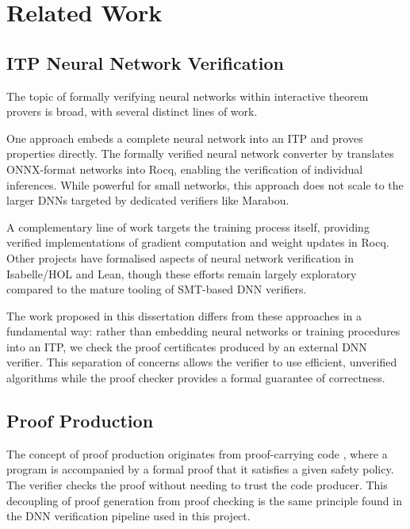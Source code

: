 \section{Related Work} \label{sec:related-work}

\subsection{ITP Neural Network Verification}

The topic of formally verifying neural networks within interactive theorem provers is broad, with several distinct lines of work.

One approach embeds a complete neural network into an ITP and proves properties directly. The formally verified neural network converter by \citet{formally_verified_nn_converter} translates ONNX-format networks into Rocq, enabling the verification of individual inferences. While powerful for small networks, this approach does not scale to the larger DNNs targeted by dedicated verifiers like Marabou.

A complementary line of work targets the training process itself, providing verified implementations of gradient computation and weight updates in Rocq. Other projects have formalised aspects of neural network verification in Isabelle/HOL and Lean, though these efforts remain largely exploratory compared to the mature tooling of SMT-based DNN verifiers.

The work proposed in this dissertation differs from these approaches in a fundamental way: rather than embedding neural networks or training procedures into an ITP, we check the proof certificates produced by an external DNN verifier. This separation of concerns allows the verifier to use efficient, unverified algorithms while the proof checker provides a formal guarantee of correctness.

\subsection{Proof Production}

The concept of proof production originates from proof-carrying code \cite{proof_carrying_code}, where a program is accompanied by a formal proof that it satisfies a given safety policy. The verifier checks the proof without needing to trust the code producer. This decoupling of proof generation from proof checking is the same principle found in the DNN verification pipeline used in this project.


